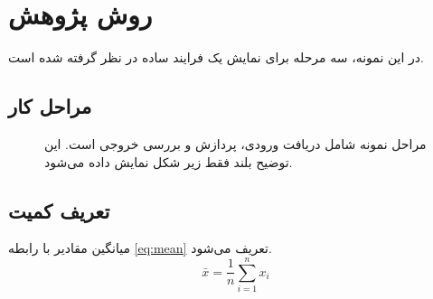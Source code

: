 \chapter{روش پژوهش}\label{ch:method}
در این نمونه، سه مرحله برای نمایش یک فرایند ساده در نظر گرفته شده است.
\section{مراحل کار}
\begin{figure}
\centering

\caption[مراحل نمونه]{مراحل نمونه شامل دریافت ورودی، پردازش و بررسی خروجی است. این توضیح بلند فقط زیر شکل نمایش داده می‌شود.}
\label{fig:workflow}
\end{figure}
\section{تعریف کمیت}
میانگین مقادیر با رابطه \ref{eq:mean} تعریف می‌شود.
\begin{equation}\label{eq:mean}
\bar{x}=\frac{1}{n}\sum_{i=1}^{n}x_i
\end{equation}

